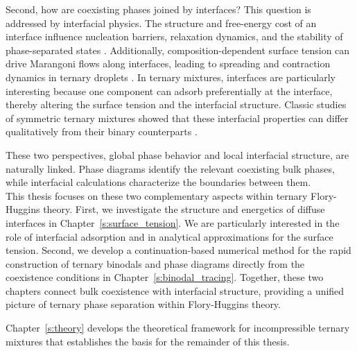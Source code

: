 \documentclass[12pt]{article}
\begin{document}
Second, how are coexisting phases joined by interfaces?
This question is addressed by interfacial physics.
The structure and free-energy cost of an interface influence nucleation barriers, relaxation dynamics, and the stability of phase-separated states \cite{Philippe2015,zwicker2025physicsdropletregulationbiological}. Additionally, composition-dependent surface tension can drive Marangoni flows along interfaces, leading to spreading and contraction dynamics in ternary droplets \cite{Baumgartner2022}. In ternary mixtures, interfaces are particularly interesting because one component can adsorb preferentially at the interface, thereby altering the surface tension and the interfacial structure. Classic studies of symmetric ternary mixtures showed that these interfacial properties can differ qualitatively from their binary counterparts \cite{Huang1996,Huang1996AnalyticInterface,Huang1999}.

These two perspectives, global phase behavior and local interfacial structure, are naturally linked.
Phase diagrams identify the relevant coexisting bulk phases, while interfacial calculations characterize the boundaries between them.\\

This thesis focuses on these two complementary aspects within ternary Flory-Huggins theory. First, we investigate the structure and energetics of diffuse interfaces in Chapter~\ref{s:surface_tension}. We are particularly interested in the role of interfacial adsorption and in analytical approximations for the surface tension.
Second, we develop a continuation-based numerical method for the rapid construction of ternary binodals and phase diagrams directly from the coexistence conditions in Chapter~\ref{s:binodal_tracing}.
Together, these two chapters connect bulk coexistence with interfacial structure, providing a unified picture of ternary phase separation within Flory-Huggins theory.

Chapter~\ref{s:theory} develops the theoretical framework for incompressible ternary mixtures that establishes the basis for the remainder of this thesis.

\end{document}

